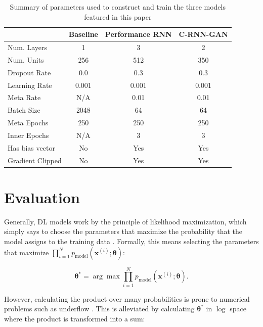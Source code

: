 \documentclass[a4paper]{book}
\begin{document}
\begin{table}[ht]
    \centering
    \begin{tabular}{l|c|c|c}
                    &\bf Baseline   &\bf Performance RNN&\bf C-RNN-GAN  \\ \hline
    Num. Layers     &   1           &   3               &   2           \\
    Num. Units      &   256         &   512             &   350         \\
    Dropout Rate    &   0.0         &   0.3             &   0.3         \\
    Learning Rate   &   0.001       &   0.001           &   0.001       \\
    Meta Rate       &   N/A         &   0.01            &   0.01        \\
    Batch Size      &   2048        &   64              &   64          \\
    Meta Epochs     &   250         &   250             &   250         \\
    Inner Epochs    &   N/A         &   3               &   3           \\
    Has bias vector &   No          &   Yes             &   Yes         \\
    Gradient Clipped&   No          &   Yes             &   Yes         \\
    \end{tabular}
    \caption{Summary of parameters used to construct and train the three models featured in this paper}
    \label{tab:params}
\end{table}

\section{Evaluation} \label{sec:evaluation}

Generally, DL models work by the principle of likelihood maximization, which simply says to choose the parameters that maximize the probability that the model assigns to the training data \parencite{goodfellow_nips_2016}. Formally, this means selecting the parameters that maximize $\prod_{i=1}^N p_{\text{model}}(\bm{x}^{(i)}; \bm{\theta})$:

\begin{equation}
    \bm{\theta^*} = \arg \max \prod_{i=1}^N p_{\text{model}}(\bm{x}^{(i)}; \bm{\theta}) \label{eq:og_mle}.
\end{equation}

However, calculating the product over many probabilities is prone to numerical problems such as underflow \parencite{goodfellow_nips_2016}. This is alleviated by calculating $\bm{\theta^*}$ in $\log$ space where the product is transformed into a sum:
\end{document}
